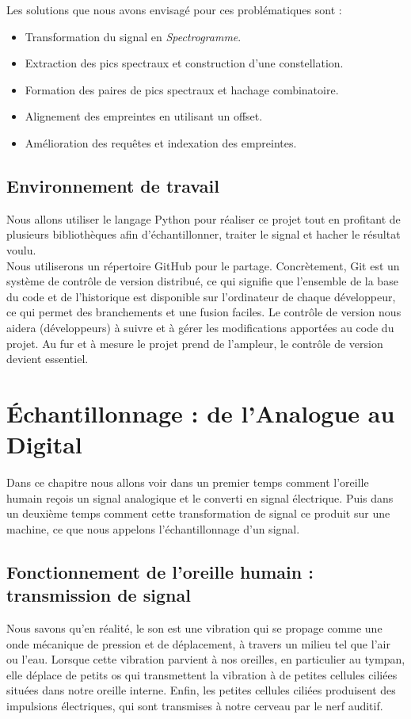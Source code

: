 \documentclass[11pt, report, french]{scrreprt}
\begin{document}
Les solutions que nous avons envisagé pour ces problématiques sont :\\

\begin{itemize}
	\item 	Transformation du signal en \textit{Spectrogramme}.
	\item 	Extraction des pics spectraux et construction d'une constellation.
	\item	Formation des paires de pics spectraux et hachage combinatoire.
	\item 	Alignement des empreintes en utilisant un offset.
	\item 	Amélioration des requêtes et indexation des empreintes.
\end{itemize}

\section{Environnement de travail}
Nous allons utiliser le langage Python pour réaliser ce projet tout en profitant de plusieurs bibliothèques afin d'échantillonner, traiter le signal et hacher le résultat voulu.\\

Nous utiliserons un répertoire GitHub pour le partage. Concrètement, Git est un système de contrôle de version distribué, ce qui signifie que l’ensemble de la base du code et de l’historique est disponible sur l’ordinateur de chaque développeur, ce qui permet des branchements et une fusion faciles.
Le contrôle de version nous aidera (développeurs) à suivre et à gérer les modifications apportées au code du projet. Au fur et à mesure le projet prend de l’ampleur, le contrôle de version devient essentiel.\\


\chapter{Échantillonnage : de l'Analogue au Digital}
\label{sampling}
Dans ce chapitre nous allons voir dans un premier temps comment l'oreille humain reçois un signal analogique et le converti en signal électrique. Puis dans un deuxième temps comment cette transformation de signal ce produit sur une machine, ce que nous appelons l'échantillonnage d'un signal.\\

\section{Fonctionnement de l'oreille humain : transmission de signal}
Nous savons qu'en réalité, le son est une vibration qui se propage comme une onde mécanique de pression et de déplacement, à travers un milieu tel que l'air ou l'eau. Lorsque cette vibration parvient à nos oreilles, en particulier au tympan, elle déplace de petits os qui transmettent la vibration à de petites cellules ciliées situées dans notre oreille interne. Enfin, les petites cellules ciliées produisent des impulsions électriques, qui sont transmises à notre cerveau par le nerf auditif.\\
\end{document}
